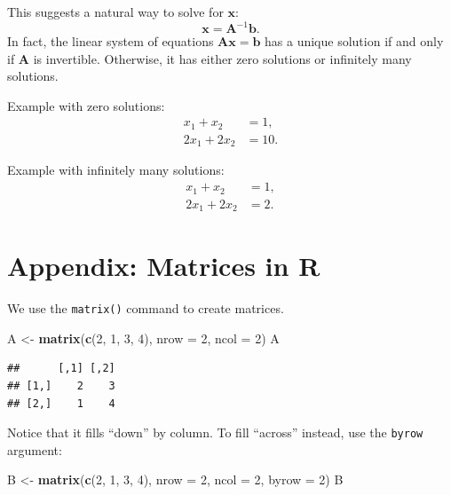 \documentclass[12pt,oneside,openany]{book}
\newenvironment{Shaded}{\begin{snugshade}}{\end{snugshade}}
\newcommand{\KeywordTok}[1]{\textcolor[rgb]{0.13,0.29,0.53}{\textbf{#1}}}
\newcommand{\DataTypeTok}[1]{\textcolor[rgb]{0.13,0.29,0.53}{#1}}
\newcommand{\DecValTok}[1]{\textcolor[rgb]{0.00,0.00,0.81}{#1}}
\newcommand{\StringTok}[1]{\textcolor[rgb]{0.31,0.60,0.02}{#1}}
\newcommand{\NormalTok}[1]{#1}
\begin{document}
This suggests a natural way to solve for \(\mathbf{x}\):
\[\mathbf{x} = \mathbf{A}^{-1} \mathbf{b}.\] In fact, the linear system
of equations \(\mathbf{A} \mathbf{x} = \mathbf{b}\) has a unique
solution if and only if \(\mathbf{A}\) is invertible. Otherwise, it has
either zero solutions or infinitely many solutions.

Example with zero solutions: \[
\begin{aligned}
x_1 + x_2 &= 1, \\
2 x_1 + 2 x_2 &= 10.
\end{aligned}
\]

Example with infinitely many solutions: \[
\begin{aligned}
x_1 + x_2 &= 1, \\
2 x_1 + 2 x_2 &= 2.
\end{aligned}
\]

\section{Appendix: Matrices in R}\label{appendix-matrices-in-r}

We use the \texttt{matrix()} command to create matrices.

\begin{Shaded}
\begin{Highlighting}[]
\NormalTok{A <-}\StringTok{ }\KeywordTok{matrix}\NormalTok{(}\KeywordTok{c}\NormalTok{(}\DecValTok{2}\NormalTok{, }\DecValTok{1}\NormalTok{, }\DecValTok{3}\NormalTok{, }\DecValTok{4}\NormalTok{),}
            \DataTypeTok{nrow =} \DecValTok{2}\NormalTok{,}
            \DataTypeTok{ncol =} \DecValTok{2}\NormalTok{)}
\NormalTok{A}
\end{Highlighting}
\end{Shaded}

\begin{verbatim}
##      [,1] [,2]
## [1,]    2    3
## [2,]    1    4
\end{verbatim}

Notice that it fills ``down'' by column. To fill ``across'' instead, use
the \texttt{byrow} argument:

\begin{Shaded}
\begin{Highlighting}[]
\NormalTok{B <-}\StringTok{ }\KeywordTok{matrix}\NormalTok{(}\KeywordTok{c}\NormalTok{(}\DecValTok{2}\NormalTok{, }\DecValTok{1}\NormalTok{, }\DecValTok{3}\NormalTok{, }\DecValTok{4}\NormalTok{),}
            \DataTypeTok{nrow =} \DecValTok{2}\NormalTok{,}
            \DataTypeTok{ncol =} \DecValTok{2}\NormalTok{,}
            \DataTypeTok{byrow =} \DecValTok{2}\NormalTok{)}
\NormalTok{B}
\end{Highlighting}
\end{Shaded}
\end{document}
